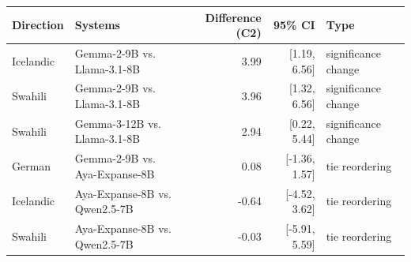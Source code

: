 \begin{tabular}{llrrl}
\toprule
Direction & Systems & Difference (C2) & 95\% CI & Type \\
\midrule
Icelandic & Gemma-2-9B vs. Llama-3.1-8B & 3.99 & [1.19, 6.56] & significance change \\
Swahili & Gemma-2-9B vs. Llama-3.1-8B & 3.96 & [1.32, 6.56] & significance change \\
Swahili & Gemma-3-12B vs. Llama-3.1-8B & 2.94 & [0.22, 5.44] & significance change \\
German & Gemma-2-9B vs. Aya-Expanse-8B & 0.08 & [-1.36, 1.57] & tie reordering \\
Icelandic & Aya-Expanse-8B vs. Qwen2.5-7B & -0.64 & [-4.52, 3.62] & tie reordering \\
Swahili & Aya-Expanse-8B vs. Qwen2.5-7B & -0.03 & [-5.91, 5.59] & tie reordering \\
\bottomrule
\end{tabular}
